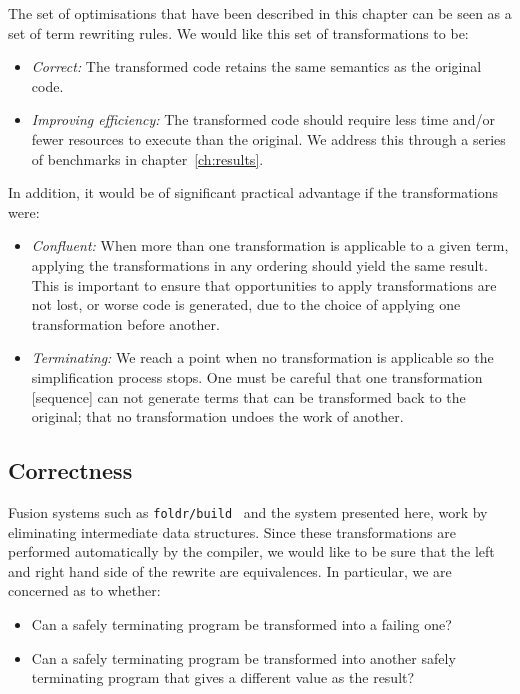 The set of optimisations that have been described in this chapter can be seen as
a set of term rewriting rules. We would like this set of transformations to be:
%
\begin{itemize}
    \item \emph{Correct:} The transformed code retains the same semantics as the
        original code.

    \item \emph{Improving efficiency:} The transformed code should require less
        time and/or fewer resources to execute than the original. We address
        this through a series of benchmarks in chapter~\ref{ch:results}.
\end{itemize}
%
In addition, it would be of significant practical advantage if the
transformations were:
%
\begin{itemize}
    \item \emph{Confluent:} When more than one transformation is applicable to a
        given term, applying the transformations in any ordering should yield
        the same result. This is important to ensure that opportunities to apply
        transformations are not lost, or worse code is generated, due to the
        choice of applying one transformation before another.

    \item \emph{Terminating:} We reach a point when no transformation is
        applicable so the simplification process stops. One must be careful that
        one transformation [sequence] can not generate terms that can be
        transformed back to the original; that no transformation undoes the work
        of another.
\end{itemize}


\subsection{Correctness}

Fusion systems such as \texttt{foldr/build}~\cite{Gill:1993de} and the system
presented here, work by eliminating intermediate data structures. Since these
transformations are performed automatically by the compiler, we would like to be
sure that the left and right hand side of the rewrite are equivalences.
In particular, we are concerned as to whether:
%
\begin{itemize}
    \item Can a safely terminating program be transformed into a failing one?
    \item Can a safely terminating program be transformed into another safely
        terminating program that gives a different value as the result?
\end{itemize}

